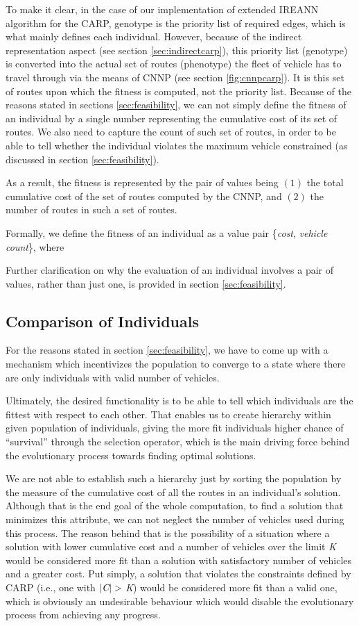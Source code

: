 \documentclass[twoside]{ctuthesis}
\theoremstyle{plain}
\theoremstyle{definition}
\theoremstyle{note}
\begin{document}
To make it clear, in the case of our implementation of extended IREANN algorithm for the CARP, genotype is the priority list of required edges, which is what mainly defines each individual. However, because of the indirect representation aspect (see section \ref{sec:indirectcarp}), this priority list (genotype) is converted into the actual set of routes (phenotype) the fleet of vehicle has to travel through via the means of CNNP (see section \ref{fig:cnnpcarp}). It is this set of routes upon which the fitness is computed, not the priority list. Because of the reasons stated in sections \ref{sec:feasibility}, we can not simply define the fitness of an individual by a single number representing the cumulative cost of its set of routes. We also need to capture the count of such set of routes, in order to be able to tell whether the individual violates the maximum vehicle constrained (as discussed in section \ref{sec:feasibility}). 

As a result, the fitness is represented by the pair of values being \emph{$(1)$} the total cumulative cost of the set of routes computed by the CNNP, and \emph{$(2)$} the number of routes in such a set of routes. 

Formally, we define the fitness of an individual as a value pair \{\emph{cost}, \emph{vehicle count}\}, where


Further clarification on why the evaluation of an individual involves a pair of values, rather than just one, is provided in section \ref{sec:feasibility}.


\subsection{Comparison of Individuals}
\label{sec:sorting}
For the reasons stated in section \ref{sec:feasibility}, we have to come up with a mechanism which incentivizes the population to converge to a state where there are only individuals with valid number of vehicles.

Ultimately, the desired functionality is to be able to tell which individuals are the fittest with respect to each other. That enables us to create hierarchy within given population of individuals, giving the more fit individuals higher chance of ``survival'' through the selection operator, which is the main driving force behind the evolutionary process towards finding optimal solutions.

We are not able to establish such a hierarchy just by sorting the population by the measure of the cumulative cost of all the routes in an individual's solution. Although that is the end goal of the whole computation, to find a solution that minimizes this attribute, we can not neglect the number of vehicles used during this process. The reason behind that is the possibility of a situation where a solution with lower cumulative cost and a number of vehicles over the limit \emph{K} would be considered more fit than a solution with satisfactory number of vehicles and a greater cost. Put simply, a solution that violates the constraints defined by CARP (i.e., one with $|\emph{C}| > $ \emph{K}) would be considered more fit than a valid one, which is obviously an undesirable behaviour which would disable the evolutionary process from achieving any progress.
\end{document}
